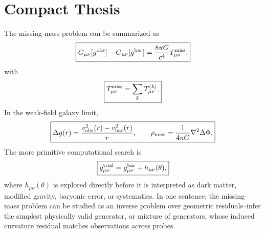 \documentclass[10pt]{article}
\newcommand{\cG}{\frac{8\pi G}{c^4}}
\newcommand{\Tmiss}{T^{\rm miss}_{\mu\nu}}
\begin{document}
\section{Compact Thesis}

The missing-mass problem can be summarized as
\begin{equation}
\boxed{
G_{\mu\nu}[g^{\rm obs}]
-
G_{\mu\nu}[g^{\rm bar}]
=
\cG \Tmiss,
}
\end{equation}
with
\begin{equation}
\boxed{
\Tmiss
=
\sum_k T^{(k)}_{\mu\nu}.
}
\end{equation}
In the weak-field galaxy limit,
\begin{equation}
\boxed{
\Delta g(r)
=
\frac{v_{\rm obs}^2(r)-v_{\rm bar}^2(r)}{r},
\qquad
\rho_{\rm miss}
=
\frac{1}{4\pi G}\nabla^2\Delta\Phi.
}
\end{equation}
The more primitive computational search is
\begin{equation}
\boxed{
g_{\mu\nu}^{\rm trial}
=
g_{\mu\nu}^{\rm bar}
+
h_{\mu\nu}(\theta),
}
\end{equation}
where $h_{\mu\nu}(\theta)$ is explored directly before it is interpreted as dark matter, modified gravity, baryonic error, or systematics. In one sentence: the missing-mass problem can be studied as an inverse problem over geometric residuals--infer the simplest physically valid generator, or mixture of generators, whose induced curvature residual matches observations across probes.
\end{document}
